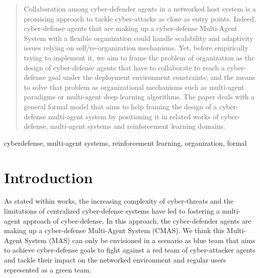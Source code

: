 \documentclass[conference]{IEEEtran}
\begin{document}
\maketitle


\begin{abstract}

    Collaboration among cyber-defender agents in a networked host system is a promising approach to tackle cyber-attacks as close as entry points. Indeed, cyber-defense agents that are making up a cyber-defense Multi-Agent System with a flexible organization could handle scalability and adaptivity issues relying on self/re-organization mechanisms. Yet, before empirically trying to implement it, we aim to frame the problem of organization as the design of cyber-defense agents that have to collaborate to reach a cyber-defense goal under the deployment environment constraints; and the means to solve that problem as organizational mechanisms such as multi-agent paradigms or multi-agent deep learning algorithms.
    The paper deals with a general formal model that aims to help framing the design of a cyber-defense multi-agent system by positioning it in related works of cyber-defense, multi-agent systems and reinforcement learning domains.

\end{abstract}

\begin{IEEEkeywords}
    cyberdefense, multi-agent systems, reinforcement learning, organization, formal
\end{IEEEkeywords}

\section{Introduction}

As stated within  works\cite{kott2023autonomous}, the increasing complexity of cyber-threats and the limitations of centralized cyber-defense systems have led to fostering a multi-agent approach of cyber-defense. In this approach, the cyber-defender agents are making up a cyber-defense Multi-Agent System (CMAS). We think this Multi-Agent System (MAS) can only be envisioned in a scenario as blue team that aims to achieve cyber-defense goals to fight against a red team of cyber-attacker agents and tackle their impact on the networked environment and regular users represented as a green team.
\end{document}
